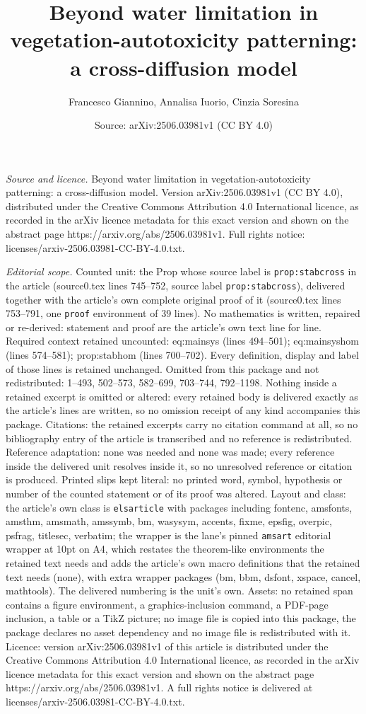 \documentclass[10pt,a4paper]{amsart}
\title[Beyond water limitation in vegetation-autotoxicity patternin]{Beyond water limitation in vegetation-autotoxicity patterning: a cross-diffusion model}
\author{Francesco Giannino, Annalisa Iuorio, Cinzia Soresina}
\date{Source: arXiv:2506.03981v1 (CC BY 4.0)}
\begin{document}
\maketitle

\noindent\emph{Source and licence.} Beyond water limitation in vegetation-autotoxicity patterning: a cross-diffusion model. Version arXiv:2506.03981v1 (CC BY 4.0), distributed under the Creative Commons Attribution 4.0 International licence, as recorded in the arXiv licence metadata for this exact version and shown on the abstract page https://arxiv.org/abs/2506.03981v1. Full rights notice: licenses/arxiv-2506.03981-CC-BY-4.0.txt.\par\smallskip

\noindent\textit{Editorial scope.} Counted unit: the Prop whose source label is \texttt{prop:stabcross} in the article (source0.tex lines 745--752, source label \texttt{prop:stabcross}), delivered together with the article's own complete original proof of it (source0.tex lines 753--791, one \texttt{proof} environment of 39 lines). No mathematics is written, repaired or re-derived: statement and proof are the article's own text line for line. Required context retained uncounted: eq:mainsys (lines 494--501); eq:mainsyshom (lines 574--581); prop:stabhom (lines 700--702). Every definition, display and label of those lines is retained unchanged. Omitted from this package and not redistributed: 1--493, 502--573, 582--699, 703--744, 792--1198. Nothing inside a retained excerpt is omitted or altered: every retained body is delivered exactly as the article's lines are written, so no omission receipt of any kind accompanies this package. Citations: the retained excerpts carry no citation command at all, so no bibliography entry of the article is transcribed and no reference is redistributed. Reference adaptation: none was needed and none was made; every reference inside the delivered unit resolves inside it, so no unresolved reference or citation is produced. Printed slips kept literal: no printed word, symbol, hypothesis or number of the counted statement or of its proof was altered. Layout and class: the article's own class is \texttt{elsarticle} with packages including fontenc, amsfonts, amsthm, amsmath, amssymb, bm, wasysym, accents, fixme, epsfig, overpic, psfrag, titlesec, verbatim; the wrapper is the lane's pinned \texttt{amsart} editorial wrapper at 10pt on A4, which restates the theorem-like environments the retained text needs and adds the article's own macro definitions that the retained text needs (none), with extra wrapper packages (bm, bbm, dsfont, xspace, cancel, mathtools). The delivered numbering is the unit's own. Assets: no retained span contains a figure environment, a graphics-inclusion command, a PDF-page inclusion, a table or a TikZ picture; no image file is copied into this package, the package declares no asset dependency and no image file is redistributed with it. Licence: version arXiv:2506.03981v1 of this article is distributed under the Creative Commons Attribution 4.0 International licence, as recorded in the arXiv licence metadata for this exact version and shown on the abstract page https://arxiv.org/abs/2506.03981v1. A full rights notice is delivered at licenses/arxiv-2506.03981-CC-BY-4.0.txt. 
\end{document}
